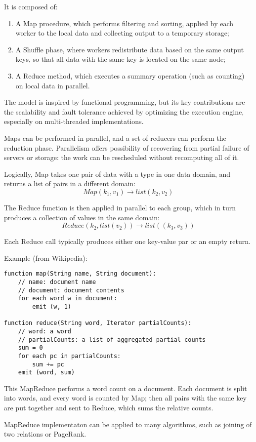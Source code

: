 It is composed of:
\begin{enumerate}
	\item A Map procedure, which performs filtering and sorting, applied by each worker to the local data and collecting output to a temporary storage;
	\item A Shuffle phase, where workers redistribute data based on the same output keys, so that all data with the same key is located on the same node;
	\item A Reduce method, which executes a summary operation (such as counting) on local data in parallel.
\end{enumerate}

The model is inspired by functional programming, but its key contributions are the scalability and fault tolerance achieved by optimizing the execution engine, especially on multi-threaded implementations. 

Maps can be performed in parallel, and a set of reducers can perform the reduction phase. Parallelism offers possibility of recovering from partial failure of servers or storage: the work can be rescheduled without recomputing all of it.

Logically, Map takes one pair of data with a type in one data domain, and returns a list of pairs in a different domain:
$$Map(k_1, v_1) \rightarrow list(k_2, v_2)$$

The Reduce function is then applied in parallel to each group, which in turn produces a collection of values in the same domain:
$$Reduce(k_2, list(v_2)) \rightarrow list((k_3, v_3))$$

Each Reduce call typically produces either one key-value par or an empty return.

Example (from Wikipedia):
\begin{lstlisting}
function map(String name, String document):
	// name: document name
	// document: document contents
	for each word w in document:
		emit (w, 1)

function reduce(String word, Iterator partialCounts):
	// word: a word
	// partialCounts: a list of aggregated partial counts
	sum = 0
	for each pc in partialCounts:
		sum += pc
	emit (word, sum)
\end{lstlisting}
This MapReduce performs a word count on a document. Each document is split into words, and every word is counted by Map; then all pairs with the same key are put together and sent to Reduce, which sums the relative counts.

MapReduce implementaton can be applied to many algorithms, such as joining of two relations or PageRank.

